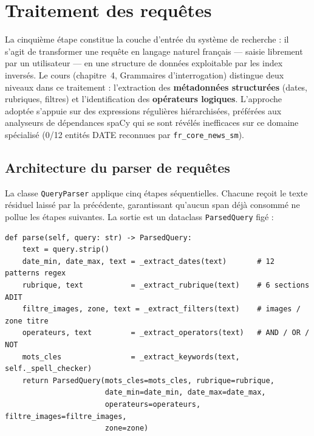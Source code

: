 \chapter{Traitement des requêtes}
\label{chap:td5}

La cinquième étape constitue la couche d'entrée du système de recherche : il s'agit de
transformer une requête en langage naturel français — saisie librement par un utilisateur
— en une structure de données exploitable par les index inversés. Le cours (chapitre~4,
Grammaires d'interrogation) distingue deux niveaux dans ce traitement : l'extraction des
\textbf{métadonnées structurées} (dates, rubriques, filtres) et l'identification des
\textbf{opérateurs logiques}. L'approche adoptée s'appuie sur des expressions régulières
hiérarchisées, préférées aux analyseurs de dépendances spaCy qui se sont révélés
inefficaces sur ce domaine spécialisé (0/12 entités DATE reconnues par
\texttt{fr\_core\_news\_sm}).

\section{Architecture du parser de requêtes}

La classe \texttt{QueryParser} applique cinq étapes séquentielles. Chacune reçoit le
texte résiduel laissé par la précédente, garantissant qu'aucun span déjà consommé
ne pollue les étapes suivantes. La sortie est un dataclass \texttt{ParsedQuery} figé :

\begin{lstlisting}[caption={Pipeline d'extraction séquentiel de \texttt{QueryParser.parse()}},
  label={lst:query_pipeline}]
def parse(self, query: str) -> ParsedQuery:
    text = query.strip()
    date_min, date_max, text = _extract_dates(text)       # 12 patterns regex
    rubrique, text           = _extract_rubrique(text)    # 6 sections ADIT
    filtre_images, zone, text = _extract_filters(text)    # images / zone titre
    operateurs, text         = _extract_operators(text)   # AND / OR / NOT
    mots_cles                = _extract_keywords(text, self._spell_checker)
    return ParsedQuery(mots_cles=mots_cles, rubrique=rubrique,
                       date_min=date_min, date_max=date_max,
                       operateurs=operateurs, filtre_images=filtre_images,
                       zone=zone)
\end{lstlisting}

